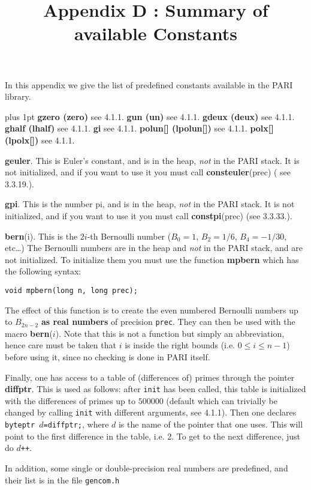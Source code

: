 \title{Appendix D : Summary of available Constants}

In this appendix we give the list of predefined constants available in the
PARI library. 

{\obeylines\parskip=0pt plus 1pt
\hbox{}
{\bf gzero (zero)} see 4.1.1.
{\bf gun (un)} see 4.1.1.
{\bf gdeux (deux)} see 4.1.1.
{\bf ghalf (lhalf)} see 4.1.1.
{\bf gi} see 4.1.1.
{\bf polun[] (lpolun[])} see 4.1.1.
{\bf polx[] (lpolx[])} see 4.1.1.}

{\bf geuler}. This is Euler's constant, and is in the heap, {\it not\/}
in the PARI stack. It is not initialized, and if you want to use it you must
call {\bf consteuler}(prec) ( see 3.3.19.).

{\bf gpi}. This is the number pi, and is in the heap, {\it not\/}
in the PARI stack. It is not initialized, and if you want to use it you must
call {\bf constpi}(prec) (see 3.3.33.).

{\bf bern}(i). This is the $2i$-th Bernoulli number ($B_0=1$, $B_2=1/6$,
$B_4=-1/30$, etc\dots) The Bernoulli numbers are
in the heap and {\it not\/} in the PARI stack, and are not initialized.
To initialize them you must use the function {\bf mpbern} which has the following
syntax:

{\tt void mpbern(long n, long prec);}

The effect of this function is to create the even numbered Bernoulli numbers up
to $B_{2n-2}$ {\bf as real numbers} of precision {\tt prec}. They can then be used with
the macro {\bf bern}($i$). Note that this is not a function but simply an abbreviation,
hence care must be taken that $i$ is inside the right bounds (i.e. $0\le i\le n-1$)
before using it, since no checking is done in PARI itself.

Finally, one has access to a table of (differences of) primes through the
pointer {\bf diffptr}. This is used as follows: after {\tt init} has been
called, this table is initialized with the differences of primes up to $500000$
(default which can trivially be changed by calling {\tt init} with different
arguments, see 4.1.1). Then one declares {\tt byteptr $d$=diffptr;}, where $d$ is
the name of the pointer that one uses. This will point to the first difference
in the table, i.e. 2. To get to the next difference, just do {\tt $d$++}.

In addition, some single or double-precision real numbers are predefined,
and their list is in the file {\tt gencom.h}


\vfill\eject
